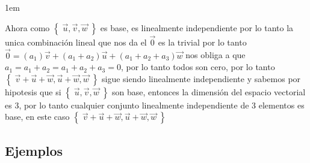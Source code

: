 \documentclass[12pt, fleqn]{report}                             %
\newenvironment{SmallIndentation}[1][0.75em]                    %
        {\begin{adjustwidth}{#1}{}\begin{footnotesize}}             %
        {\end{footnotesize}\end{adjustwidth}}                       %
\theoremstyle{break}                                            %
\newcommand{\Set}[1]            {\left\{ \; #1 \; \right\}}     %
\begin{document}
\begin{itemize}
\begin{SmallIndentation}[1em]
                            Ahora como $\Set{\vec u, \vec v, \vec w}$ es base, es linealmente independiente
                            por lo tanto la unica combinación lineal que nos da el $\vec 0$ es la trivial
                            por lo tanto $\vec 0 = (a_1)\vec v + (a_1 + a_2)\vec u  + (a_1 + a_2 + a_3)\vec w$
                            nos obliga a que $a_1 = a_1 + a_2 = a_1 + a_2 + a_3 = 0$, por lo tanto
                            todos son cero, por lo tanto $\Set{\vec v + \vec u + \vec w, \vec u + \vec w, \vec w}$
                            sigue siendo linealmente independiente y sabemos por hipotesis que si 
                            $\Set{\vec u, \vec v, \vec w}$ son base, entonces la dimensión del espacio vectorial
                            es 3, por lo tanto cualquier conjunto linealmente independiente de 3 elementos
                            es base, en este caso $\Set{\vec v + \vec u + \vec w, \vec u + \vec w, \vec w}$

                        \end{SmallIndentation}
                         

                \end{itemize}



            \clearpage
            \subsection{Ejemplos}
\end{document}
